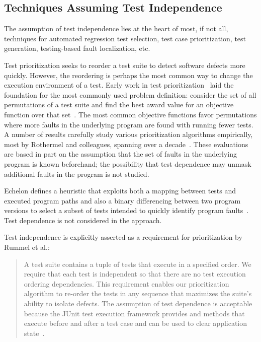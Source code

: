 \subsection{Techniques Assuming Test Independence}

The assumption of test independence lies at the heart of most,
if not all, techniques for automated regression test selection,
test case prioritization, test generation, testing-based
fault localization, etc. 


Test prioritization seeks to reorder a test suite to detect
software defects more quickly. However,
the reordering is perhaps the most common way to change the
execution environment of a test. Early work in test
prioritization~\cite{Wong:1997:SER:851010.856115,Rothermel:1999:TCP:519621.853398}
laid the foundation for the most commonly used problem definition:
consider the set of all permutations of a test suite and find the best
award value for an objective function over that
set~\cite{Elbaum:2000:PTC:347324.348910}.  The most common objective
functions favor permutations where more faults in the underlying
program  are found with running fewer tests.
A number of results carefully study various prioritization algorithms
empirically, most by Rothermel and colleagues,
spanning over a decade~\cite[\emph{et
alia}]{Rothermel:1999:TCP:519621.853398,Do:2010:ETC:1907658.1908088}.  These evaluations are based in part on the assumption that the set of faults in the underlying program is known beforehand; the possibility that test dependence may unmask additional faults in the program is not studied.


Echelon defines a
heuristic that exploits both a mapping between tests and
executed program paths and also a binary differencing between two
program versions to select a subset of tests intended to quickly
identify program faults~\cite{Srivastava:2002:EPT:566172.566187}.
Test dependence is not considered in the approach.



Test independence is explicitly asserted as a requirement for
prioritization by Rummel et al.:
\begin{quote}
A test suite contains a tuple of tests  that execute in a specified order.  We require that each test is
independent so that there are no test execution ordering dependencies.  This requirement enables our prioritization algorithm to
re-order the tests in any sequence that maximizes the suite's
ability to isolate defects.  The assumption of test dependence
is acceptable because the JUnit test execution framework
provides  and  methods that execute before
and after a test case and can be used to clear application state~\cite[p.~1500]{Rummel:2005:TPR:1066677.1067016}.
\end{quote}

